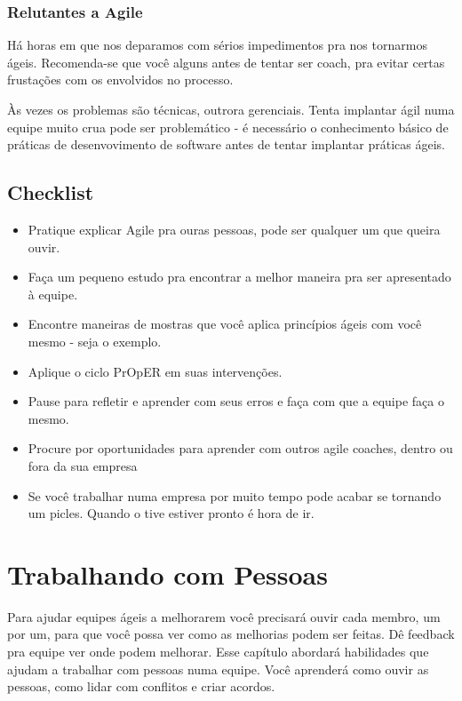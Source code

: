\documentclass[a4paper, 10pt, font=plain]{abnt}
\begin{document}
\subsection{Relutantes a Agile}
Há horas em que nos deparamos com sérios impedimentos pra nos tornarmos ágeis. Recomenda-se que você alguns antes de tentar ser coach, pra evitar certas frustações com os envolvidos no processo.

Às vezes os problemas são técnicas, outrora gerenciais. Tenta implantar ágil numa equipe muito crua pode ser problemático - é necessário o conhecimento básico de práticas de desenvovimento de software antes de tentar implantar práticas ágeis.

\section{Checklist}
\begin{itemize}
\item Pratique explicar Agile pra ouras pessoas, pode ser qualquer um que queira ouvir.
\item Faça um pequeno estudo pra encontrar a melhor maneira pra ser apresentado à equipe.
\item Encontre maneiras de mostras que você aplica princípios ágeis com você mesmo - seja o exemplo.
\item Aplique o ciclo PrOpER em suas intervenções.
\item Pause para refletir e aprender com seus erros e faça com que a equipe faça o mesmo.
\item Procure por oportunidades para aprender com outros agile coaches, dentro ou fora da sua empresa
\item Se você trabalhar numa empresa por muito tempo pode acabar se tornando um picles. Quando o tive estiver pronto é hora de ir.
\end{itemize}



\chapter{Trabalhando com Pessoas}
Para ajudar equipes ágeis a melhorarem você precisará ouvir cada membro, um por um, para que você possa ver como as melhorias podem ser feitas. Dê feedback pra equipe ver onde podem melhorar.
Esse capítulo abordará habilidades que ajudam a trabalhar com pessoas numa equipe. Você aprenderá como ouvir as pessoas, como lidar com conflitos e criar acordos.
\end{document}
